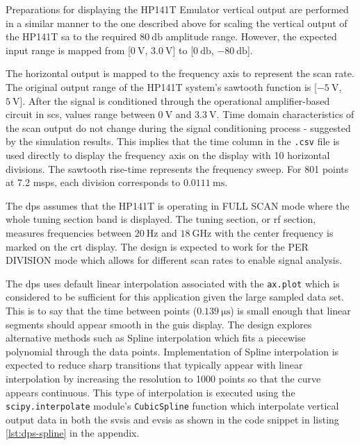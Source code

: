 \documentclass[class=report,11pt,crop=false]{standalone}
\begin{document}
	Preparations for displaying the HP141T Emulator vertical output are performed in a similar manner to the one described above for scaling the vertical output of the HP141T \acrshort{sa} to the required $\SI{80}{\decibel}$ amplitude range.  However, the expected input range is mapped from [$\SI{0}{\volt}$, $\SI{3.0}{\volt}$] to [$\SI{0}{\decibel}$, $-\SI{80}{\decibel}$].
	
	The horizontal output is mapped to the frequency axis to represent the scan rate. The original output range of the HP141T system's sawtooth function is [$-\SI{5}{\volt}$, $\SI{5}{\volt}$]. After the signal is conditioned through the operational amplifier-based circuit in \acrshort{scs}, values range between $\SI{0}{\volt}$ and $\SI{3.3}{\volt}$. Time domain characteristics of the scan output do not change during the signal conditioning process - suggested by the simulation results. This implies that the time column in the \texttt{.csv} file is used directly to display the frequency axis on the display with 10 horizontal divisions. The sawtooth rise-time represents the frequency sweep. For 801 points at 7.2 \acrshort{msps}, each division corresponds to $\SI{0.0111}{\milli\second}$. 
	
	The \acrshort{dps} assumes that the HP141T is operating in FULL SCAN mode where the whole tuning section band is displayed. The tuning section, or \acrshort{rf} section, measures frequencies between $\SI{20}{\hertz}$ and $\SI{18}{\giga\hertz}$ with the center frequency is marked on the \acrshort{crt} display. The design is expected to work for the PER DIVISION mode which allows for different scan rates to enable signal analysis. 
	
	The \acrshort{dps} uses default linear interpolation associated with the \texttt{ax.plot} which is considered to be sufficient for this application given the large sampled data set. This is to say that the time between points ($\SI{0.139}{\micro\second}$) is small enough that linear segments should appear smooth in the \acrshort{guis} display. The design explores alternative methods such as Spline interpolation which fits a piecewise polynomial through the data points. Implementation of Spline interpolation is expected to reduce sharp transitions that typically appear with linear interpolation by increasing the resolution to 1000 points so that the curve appears continuous. This type of interpolation is executed using the \texttt{scipy.interpolate} module's \texttt{CubicSpline} function which interpolate vertical output data in both the \acrshort{svsis} and \acrshort{evsis} as shown in the code snippet in listing \ref{lst:dps-spline} in the appendix. 
	
\end{document}
